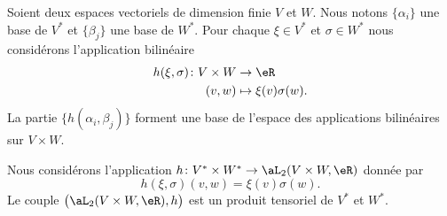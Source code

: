 \begin{lemma}		\label{LEMooPBLRooJePqlk}
	Soient deux espaces vectoriels de dimension finie \( V\) et \( W\). Nous notons \( \{ \alpha_i \}\) une base de \( V^*\) et \( \{ \beta_j \}\) une base de \( W^*\). Pour chaque \( \xi\in V^*\) et \( \sigma\in W^*\) nous considérons l'application bilinéaire
	\begin{equation}
		\begin{aligned}
			h(\xi,\sigma)\colon V\times W & \to \eR                  \\
			(v,w)                         & \mapsto \xi(v)\sigma(w).
		\end{aligned}
	\end{equation}
	La partie \( \{ h(\alpha_i,\beta_j) \}\) forment une base de l'espace des applications bilinéaires sur \( V\times W\).
\end{lemma}

\begin{proposition}		\label{PROPooIFVBooGiMskq}
	Nous considérons l'application \(h \colon V^*\times W^*\to \aL_2(V\times W,\eR)  \) donnée par
	\begin{equation}
		h(\xi,\sigma)(v,w)=\xi(v)\sigma(w).
	\end{equation}
	Le couple \( \big( \aL_2(V\times W,\eR),h \big)\) est un produit tensoriel de \( V^*\) et \( W^*\).
\end{proposition}

